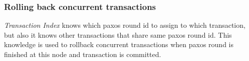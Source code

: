 









\subsubsection{Rolling back concurrent transactions}
\emph{Transaction Index} knows which paxos round id to assign to which transaction, but also it knows other transactions that share same paxos round id. This knowledge is used to rollback concurrent transactions when paxos round is finished at this node and transaction is committed.




